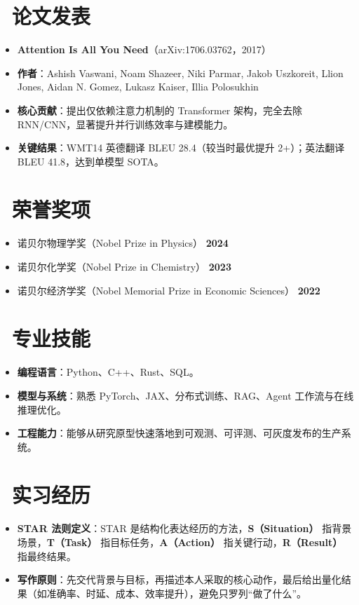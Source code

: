 \documentclass{resume}
\begin{document}
\section{\faBook\ 论文发表}
\begin{itemize}
    \item \textbf{Attention Is All You Need}（arXiv:1706.03762，2017）
    \item \textbf{作者}：Ashish Vaswani, Noam Shazeer, Niki Parmar, Jakob Uszkoreit, Llion Jones, Aidan N. Gomez, Lukasz Kaiser, Illia Polosukhin
    \item \textbf{核心贡献}：提出仅依赖注意力机制的 Transformer 架构，完全去除 RNN/CNN，显著提升并行训练效率与建模能力。
    \item \textbf{关键结果}：WMT14 英德翻译 BLEU 28.4（较当时最优提升 2+）；英法翻译 BLEU 41.8，达到单模型 SOTA。
\end{itemize}

\section{\faTrophy\ 荣誉奖项}
\begin{itemize}
    \item 诺贝尔物理学奖（Nobel Prize in Physics） \hfill \textbf{2024}
    \item 诺贝尔化学奖（Nobel Prize in Chemistry） \hfill \textbf{2023}
    \item 诺贝尔经济学奖（Nobel Memorial Prize in Economic Sciences） \hfill \textbf{2022}
\end{itemize}

\section{\faCogs\ 专业技能}
\begin{itemize}[parsep=0.2ex]
    \item \textbf{编程语言}：Python、C++、Rust、SQL。
    \item \textbf{模型与系统}：熟悉 PyTorch、JAX、分布式训练、RAG、Agent 工作流与在线推理优化。
    \item \textbf{工程能力}：能够从研究原型快速落地到可观测、可评测、可灰度发布的生产系统。
\end{itemize}

\section{\faBriefcase\ 实习经历}
\begin{itemize}
    \item \textbf{STAR 法则定义}：STAR 是结构化表达经历的方法，\textbf{S（Situation）} 指背景场景，\textbf{T（Task）} 指目标任务，\textbf{A（Action）} 指关键行动，\textbf{R（Result）} 指最终结果。
    \item \textbf{写作原则}：先交代背景与目标，再描述本人采取的核心动作，最后给出量化结果（如准确率、时延、成本、效率提升），避免只罗列“做了什么”。
\end{itemize}
\end{document}
